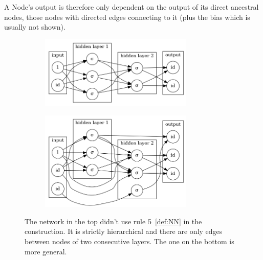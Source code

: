 \documentclass[11pt, a4paper]{report}
\theoremstyle{plain}
\theoremstyle{definition}
\theoremstyle{remark}
\begin{document}
A Node's output is therefore only dependent on the output of its direct
ancestral nodes, those nodes with
directed edges connecting to it (plus the bias which is usually not shown).

\begin{figure}[!h]
\begin{framed}
\centering
\begin{subfigure}[b]{0.5\textwidth}
\includegraphics[width=0.8\textwidth]{./images/models/neuronlayers.gv.png}
\end{subfigure}
\begin{subfigure}[b]{0.5\textwidth}
\includegraphics[width=0.8\textwidth]{./images/models/neuronlayers.2.gv.png}
\end{subfigure}
\caption{The network in the top didn't use rule 5~\ref{def:NN} in the construction.
It is strictly hierarchical and there are only edges between nodes of two
consecutive layers. The one on the bottom is more general.
}
\label{fig:nn1}
\end{framed}
\end{figure}


\end{document}
